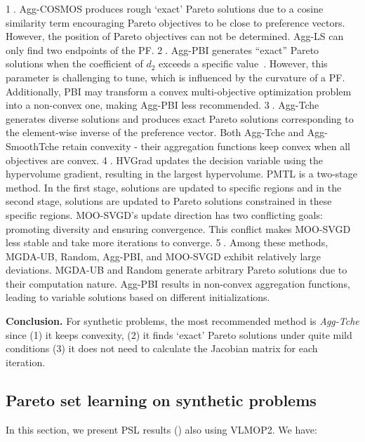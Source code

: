 \textcircled{1}. Agg-COSMOS produces rough `exact' Pareto solutions due to a cosine similarity term encouraging Pareto objectives to be close to preference vectors. However, the position of Pareto objectives can not be determined. Agg-LS can only find two endpoints of the PF. 
\textcircled{2}. Agg-PBI generates ``exact'' Pareto solutions when the coefficient of \( d_2 \) exceeds a specific value~\cite{wang2021parameter}. However, this parameter is challenging to tune, which is influenced by the curvature of a PF. Additionally, PBI may transform a convex multi-objective optimization problem into a non-convex one, making Agg-PBI less recommended.
\textcircled{3}. Agg-Tche generates diverse solutions and produces exact Pareto solutions corresponding to the element-wise inverse of the preference vector. Both Agg-Tche and Agg-SmoothTche retain convexity - their aggregation functions keep convex when all objectives are convex.
\textcircled{4}. HVGrad updates the decision variable using the hypervolume gradient, resulting in the largest hypervolume.
PMTL is a two-stage method. In the first stage, solutions are updated to specific regions and in the second stage, solutions are updated to Pareto solutions constrained in these specific regions. MOO-SVGD's update direction has two conflicting goals: promoting diversity and ensuring convergence. This conflict makes MOO-SVGD less stable and take more iterations to converge. 
\textcircled{5}. Among these methods, MGDA-UB, Random, Agg-PBI, and MOO-SVGD exhibit relatively large deviations. MGDA-UB and Random generate arbitrary Pareto solutions due to their computation nature. Agg-PBI results in non-convex aggregation functions, leading to variable solutions based on different initializations.

\textbf{Conclusion.} For synthetic problems, the most recommended method is \emph{Agg-Tche} since (1) it keeps convexity, (2) it finds `exact' Pareto solutions under quite mild conditions (3) it does not need to calculate the Jacobian matrix for each iteration.

\subsection{Pareto set learning on synthetic problems}
In this section, we present PSL results () also using VLMOP2. We have:

